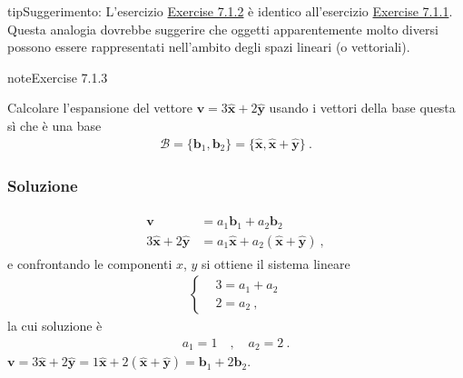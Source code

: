 \documentclass[letterpaper,10pt,italian]{jupyterBook}
\begin{document}
\begin{sphinxadmonition}{tip}{Suggerimento:}
\sphinxAtStartPar
L’esercizio \hyperref[exercise:ex-vectors-euclidean]{Exercise 7.1.2} è identico all’esercizio \hyperref[exercise:ex-vectors-polynomials]{Exercise 7.1.1}. Questa analogia dovrebbe suggerire che oggetti apparentemente molto diversi possono essere rappresentati nell’ambito degli spazi lineari (o vettoriali).
\end{sphinxadmonition}
 \label{exercise:ex-vectors-euclidean-1}

\begin{sphinxadmonition}{note}{Exercise 7.1.3}



\sphinxAtStartPar
Calcolare l’espansione del vettore \(\mathbf{v} = 3 \hat{\mathbf{x}} + 2 \hat{\mathbf{y}}\) usando i vettori della base \sphinxhyphen{} questa sì che è una base \sphinxhyphen{}
\begin{equation*}
\begin{split}\mathcal{B} = \{  \mathbf{b}_1, \mathbf{b}_2 \} = \{ \hat{\mathbf{x}}, \hat{\mathbf{x}} + \hat{\mathbf{y}} \} \ .\end{split}
\end{equation*}\subsubsection*{Soluzione}
\begin{equation*}
\begin{split}\begin{aligned}
  \mathbf{v} & = a_1 \mathbf{b}_1 + a_2 \mathbf{b}_2 \\
  3 \hat{\mathbf{x}} + 2 \hat{\mathbf{y}} & = a_1 \hat{\mathbf{x}} + a_2 (\hat{\mathbf{x}} + \hat{\mathbf{y}} ) \ ,
\end{aligned}\end{split}
\end{equation*}
\sphinxAtStartPar
e confrontando le componenti \(x\), \(y\) si ottiene il sistema lineare
\begin{equation*}
\begin{split}\left\{\begin{aligned}
  & 3 = a_1 + a_2 \\
  & 2 = a_2 \ ,
\end{aligned}\right.\end{split}
\end{equation*}
\sphinxAtStartPar
la cui soluzione è
\begin{equation*}
\begin{split}a_1 = 1 \quad , \quad a_2 = 2 \ .\end{split}
\end{equation*}
\sphinxAtStartPar
{} \(\mathbf{v} = 3 \hat{\mathbf{x}} + 2 \hat{\mathbf{y}} = 1 \hat{\mathbf{x}} + 2 (\hat{\mathbf{x}} +\hat{\mathbf{y}}) = \mathbf{b}_1 + 2 \mathbf{b}_2\).
\end{sphinxadmonition}
\end{document}
